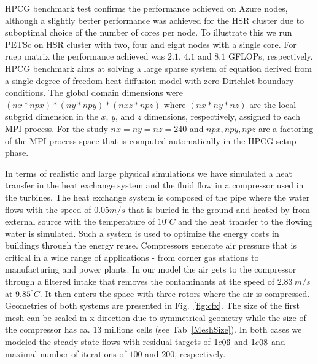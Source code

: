 \documentclass[3p,times]{elsarticle}
\begin{document}
HPCG benchmark test confirms the performance achieved on Azure nodes, although a slightly better performance was achieved for the HSR cluster due to suboptimal choice of the number of cores per node.  To illustrate this we run PETSc on HSR cluster with two, four and eight nodes with a single core. For ruep matrix the performance achieved was $2.1$, $4.1$ and $8.1$ GFLOPs, respectively. HPCG benchmark aims at solving a large sparse system of equation derived from a single degree of freedom heat diffusion model with zero Dirichlet boundary conditions. The global domain dimensions were $(nx * npx ) * (ny * npy ) * (nxz * npz )$ where $(nx * ny * nz )$ are the local subgrid dimension in the $x$, $y$, and $z$ dimensions, respectively, assigned to each MPI process. For the study $nx = ny = nz = 240$ and $npx, npy, npz$ are a factoring of the MPI process space that is computed automatically in the HPCG setup phase.

In terms of realistic and large physical simulations we have simulated a heat transfer in the heat exchange system and the fluid flow in a compressor used in the turbines. The heat exchange system is composed of the  pipe where the water flows with the speed of $0.05 m/s$ that is buried in the ground and heated by from external source with the temperature of $10 ^\circ C$ and the heat transfer to the flowing water is simulated. Such a system is used to optimize the energy costs in buildings through the energy reuse.  
Compressors generate air pressure that is critical in a wide range of applications - from corner gas stations to manufacturing and power plants. In our model the air gets to the compressor through a filtered intake that removes the contaminants at the speed of $2.83\ m/s$ at $9.85 ^\circ C$. It then enters the space with three rotors where the air is compressed. Geometries of both systems are presented in Fig.~\ref{fig:cfx}. The size of the first mesh can be scaled  in x-direction due to symmetrical geometry while the size of the compressor has ca. 13 millions cells (see Tab~\ref{MeshSize}). In both cases we modeled the steady state flows with residual targets of $1e\-06$ and $1e\-08$ and maximal number of iterations of $100$ and $200$, respectively. 
\end{document}
